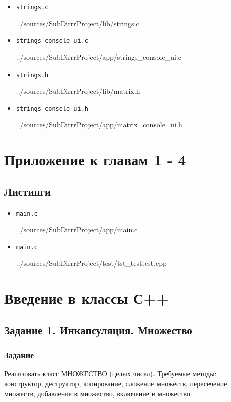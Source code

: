 \documentclass[12pt,a4paper]{report}
\begin{document}
\begin{itemize}
\item[] \verb-strings.c-

{../sources/SubDirrrProject/lib/strings.c}
\item[] \verb-strings_console_ui.c-

{../sources/SubDirrrProject/app/strings_console_ui.c}
\item[] \verb-strings.h-

{../sources/SubDirrrProject/lib/matrix.h}
\item[] \verb-strings_console_ui.h-

{../sources/SubDirrrProject/app/matrix_console_ui.h}
\end{itemize}
%

\chapter{Приложение к главам 1 - 4}

\section{Листинги}
\begin{itemize}
\item[] \verb-main.c-

{../sources/SubDirrrProject/app/main.c}
\item[] \verb-main.c-

{../sources/SubDirrrProject/test/tst_testtest.cpp}
\end{itemize}
%

\chapter{Введение в классы С++}
\section{Задание 1. Инкапсуляция. Множество}
\subsection{Задание}
\hspace{\parindent}
Реализовать класс МНОЖЕСТВО (целых чисел). Требуемые методы: конструктор, деструктор, копирование, сложение множеств, пересечение множеств, добавление в множество, включение в множество.
\end{document}

